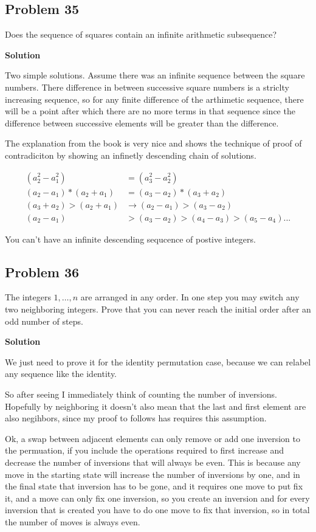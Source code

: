 \documentclass[12pt,tikz,border=10pt]{article}
\theoremstyle{definition}
\theoremstyle{remark}
\begin{document}
\subsection{Problem 35}
Does the sequence of squares contain an infinite arithmetic subsequence?

\textbf{Solution}

Two simple solutions. Assume there was an infinite sequence between the square numbers.
There difference in between successive square numbers is a striclty increasing sequence, so 
for any finite difference of the arthimetic sequence, there will be a point after which there are no more terms in 
that sequence since the difference between successive elements will be greater than the difference.

The explanation from the book is very nice and shows the technique of proof of contradiciton 
by showing an infinetly descending chain of solutions.

\begin{align*}
    (a_{2}^2-a_1^2)&=(a_{3}^2-a_{2}^2) \\
    (a_{2}-a_1)*(a_{2}+a_1)&=(a_{3}-a_{2})*(a_{3}+a_{2})\\
    (a_3+a_2)>(a_2+a_1)&\rightarrow (a_{2}-a_1)>(a_{3}-a_{2})\\
    (a_2-a_1)&>(a_3-a_2)>(a_4-a_3)>(a_5-a_4)...
\end{align*}

You can't have an infinite descending sequcence of postive integers.

\subsection{Problem 36}
The integers $1, \ldots, n$ are arranged in any order. In one step you may switch any two
neighboring integers. Prove that you can never reach the initial order after an odd
number of steps.

\textbf{Solution}

We just need to prove it for the identity permutation case, because we can relabel 
any sequence like the identity. 

So after seeing I immediately think of counting the number of inversions. 
Hopefully by neighboring it doesn't also mean that the last and first element are also
negihbors, since my proof to follows has requires this assumption.

Ok, a swap between adjacent elements can only remove or add one inversion to the 
permuation, if you include the operations required to first increase and decrease the number 
of inversions that will always be even. This is because any move in the starting state will 
increase the number of inversions by one, and in the final state that inversion has to be
gone, and it requires one move to put fix it, and a move can only fix one inversion, so 
you create an inversion and for every inversion that is created you have to do one move 
to fix that inversion, so in total the number of moves is always even. 
\end{document}

